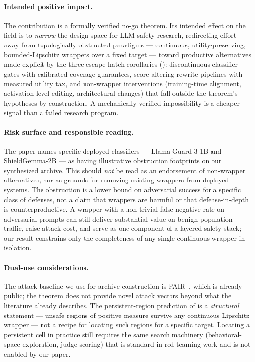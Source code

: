 \documentclass[11pt]{article}
\begin{document}
\paragraph{Intended positive impact.}
The contribution is a formally verified no-go theorem. Its intended
effect on the field is to \emph{narrow} the design space for LLM
safety research, redirecting effort away from topologically
obstructed paradigms --- continuous, utility-preserving,
bounded-Lipschitz wrappers over a fixed target --- toward productive
alternatives made explicit by the three escape-hatch corollaries
(): discontinuous classifier gates with
calibrated coverage guarantees, score-altering rewrite pipelines with
measured utility tax, and non-wrapper interventions (training-time
alignment, activation-level editing, architectural changes) that fall
outside the theorem's hypotheses by construction. A mechanically
verified impossibility is a cheaper signal than a failed research
program.

\paragraph{Risk surface and responsible reading.}
The paper names specific deployed classifiers --- Llama-Guard-3-1B and
ShieldGemma-2B --- as having illustrative obstruction footprints on
our synthesized archive. This should \emph{not} be read as an
endorsement of non-wrapper alternatives, nor as grounds for removing
existing wrappers from deployed systems. The obstruction is a lower
bound on adversarial success for a specific class of defenses, not a
claim that wrappers are harmful or that defense-in-depth is
counterproductive. A wrapper with a non-trivial false-negative rate
on adversarial prompts can still deliver substantial value on
benign-population traffic, raise attack cost, and serve as one
component of a layered safety stack; our result constrains only the
completeness of any single continuous wrapper in isolation.

\paragraph{Dual-use considerations.}
The attack baseline we use for archive construction is
PAIR~\cite{chao2024jailbreaking}, which is already public; the
theorem does not provide novel attack vectors beyond what the
literature already describes. The persistent-region prediction of
 is a \emph{structural} statement --- unsafe
regions of positive measure survive any continuous Lipschitz wrapper
--- not a recipe for locating such regions for a specific target.
Locating a persistent cell in practice still requires the same
search machinery (behavioral-space exploration, judge scoring) that
is standard in red-teaming work and is not enabled by our paper.
\end{document}
